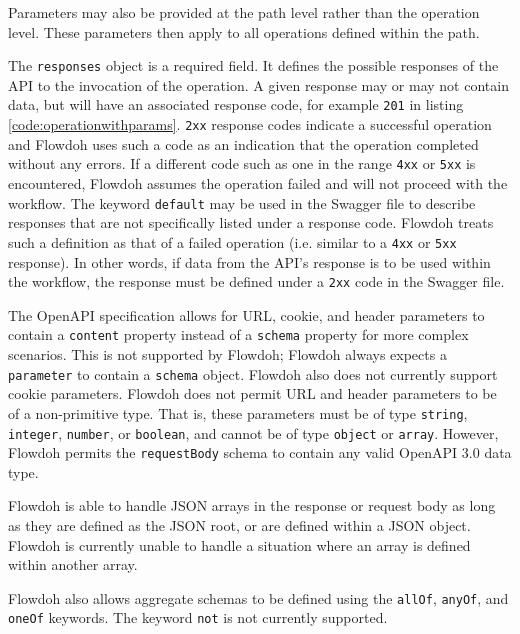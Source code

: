 Parameters may also be provided at the path level rather than the operation level. These parameters then apply to all operations defined within the path.

The \texttt{responses} object is a required field. It defines the possible responses of the API to the invocation of the operation. A given response may or may not contain data, but will have an associated response code, for example \texttt{201} in listing \ref{code:operationwithparams}. \texttt{2xx} response codes indicate a successful operation and Flowdoh uses such a code as an indication that the operation completed without any errors. If a different code such as one in the range \texttt{4xx} or \texttt{5xx} is encountered, Flowdoh assumes the operation failed and will not proceed with the workflow. The keyword \texttt{default} may be used in the Swagger file to describe responses that are not specifically listed under a response code. Flowdoh treats such a definition as that of a failed operation (i.e. similar to a \texttt{4xx} or \texttt{5xx} response). In other words, if data from the API's response is to be used within the workflow, the response must be defined under a \texttt{2xx} code in the Swagger file.

The OpenAPI specification allows for URL, cookie, and header parameters to contain a \texttt{content} property instead of a \texttt{schema} property for more complex scenarios\cite{parameters}. This is not supported by Flowdoh; Flowdoh always expects a \texttt{parameter} to contain a \texttt{schema} object. Flowdoh also does not currently support cookie parameters. Flowdoh does not permit URL and header parameters to be of a non-primitive type. That is, these parameters must be of type \texttt{string}, \texttt{integer}, \texttt{number}, or \texttt{boolean}, and cannot be of type \texttt{object} or \texttt{array}. However, Flowdoh permits the \texttt{requestBody} schema to contain any valid OpenAPI 3.0 data type.

Flowdoh is able to handle JSON arrays in the response or request body as long as they are defined as the JSON root, or are defined within a JSON object. Flowdoh is currently unable to handle a situation where an array is defined within another array.

Flowdoh also allows aggregate schemas to be defined using the \texttt{allOf}, \texttt{anyOf}, and \texttt{oneOf} keywords. The keyword \texttt{not} is not currently supported.

